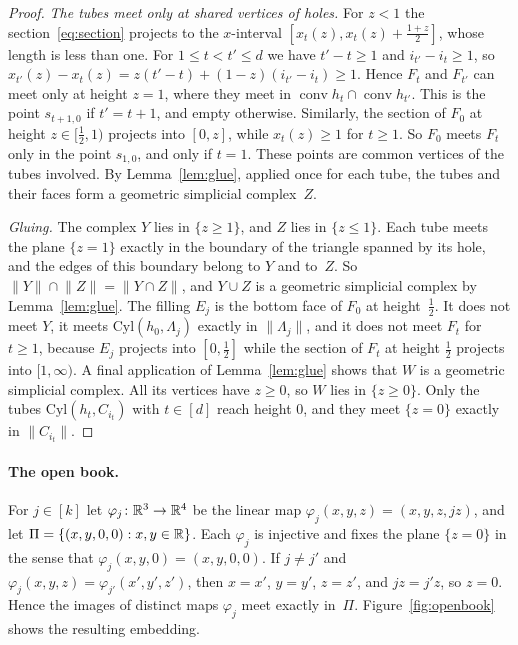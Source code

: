 \begin{proof}
\emph{The tubes meet only at shared vertices of holes.}
For $z<1$ the section~\eqref{eq:section} projects to the $x$-interval $[x_t(z),x_t(z)+\frac{1+z}{2}]$, whose length is less than one.
For $1\le t<t'\le d$ we have $t'-t\ge1$ and $i_{t'}-i_t\ge1$, so $x_{t'}(z)-x_t(z)=z(t'-t)+(1-z)(i_{t'}-i_t)\ge1$.
Hence $F_t$ and $F_{t'}$ can meet only at height $z=1$, where they meet in $\operatorname{conv}h_t\cap\operatorname{conv}h_{t'}$.
This is the point $s_{t+1,0}$ if $t'=t+1$, and empty otherwise.
Similarly, the section of $F_0$ at height $z\in[\frac12,1)$ projects into $[0,z]$, while $x_t(z)\ge1$ for $t\ge1$.
So $F_0$ meets $F_t$ only in the point $s_{1,0}$, and only if $t=1$.
These points are common vertices of the tubes involved.
By Lemma~\ref{lem:glue}, applied once for each tube, the tubes and their faces form a geometric simplicial complex~$Z$.

\emph{Gluing.}
The complex $Y$ lies in $\{z\ge1\}$, and $Z$ lies in $\{z\le1\}$.
Each tube meets the plane $\{z=1\}$ exactly in the boundary of the triangle spanned by its hole, and the edges of this boundary belong to $Y$ and to~$Z$.
So $\lVert Y\rVert\cap\lVert Z\rVert=\lVert Y\cap Z\rVert$, and $Y\cup Z$ is a geometric simplicial complex by Lemma~\ref{lem:glue}.
The filling $E_j$ is the bottom face of $F_0$ at height~$\frac12$.
It does not meet $Y$, it meets $\mathrm{Cyl}(h_0,\Lambda_j)$ exactly in $\lVert \Lambda_j\rVert$, and it does not meet $F_t$ for $t\ge1$, because $E_j$ projects into $[0,\frac12]$ while the section of $F_t$ at height $\frac12$ projects into $[1,\infty)$.
A final application of Lemma~\ref{lem:glue} shows that $W$ is a geometric simplicial complex.
All its vertices have $z\ge0$, so $W$ lies in $\{z\ge0\}$.
Only the tubes $\mathrm{Cyl}(h_t,C_{i_t})$ with $t\in[d]$ reach height $0$, and they meet $\{z=0\}$ exactly in $\lVert C_{i_t}\rVert$.
\end{proof}



\paragraph{The open book.}
For $j\in[k]$ let $\varphi_j\colon\mathbb{R}^3\to\mathbb{R}^4$ be the linear map $\varphi_j(x,y,z)=(x,y,z,jz)$, and let $\Pi=\{(x,y,0,0):x,y\in\mathbb{R}\}$.
Each $\varphi_j$ is injective and fixes the plane $\{z=0\}$ in the sense that $\varphi_j(x,y,0)=(x,y,0,0)$.
If $j\ne j'$ and $\varphi_j(x,y,z)=\varphi_{j'}(x',y',z')$, then $x=x'$, $y=y'$, $z=z'$, and $jz=j'z$, so $z=0$.
Hence the images of distinct maps $\varphi_j$ meet exactly in~$\Pi$.
Figure~\ref{fig:openbook} shows the resulting embedding.


